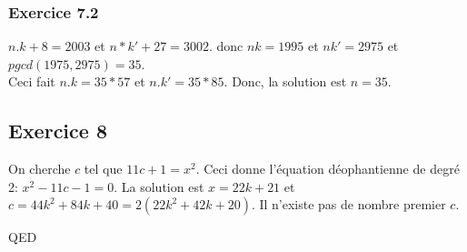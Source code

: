\documentclass[]{book}
\theoremstyle{definition}
\begin{document}
\subsubsection*{Exercice 7.2}
$n.k+8 = 2003$ et $n*k' + 27 = 3002$. donc $nk=1995$ et $nk'=2975$ et $pgcd(1975,2975) = 35$.\\
Ceci fait $n.k=35*57$ et $n.k'=35*85$. Donc, la solution est $n=35$.  	
 

\subsection*{Exercice 8}
On cherche $c$ tel que $11c+1 = x^2$. Ceci donne l'\'equation d\'eophantienne de degr\'e 2: $x^2 -11c-1 = 0$.
La solution est $x=22k+21$ et $c=44k^2+84k+40=2(22k^2+42k+20)$. 
Il n'existe pas de nombre premier $c$.

QED
\end{document}
